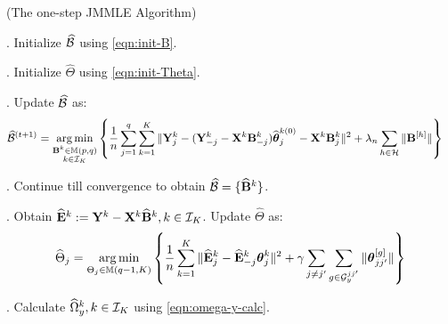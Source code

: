 \begin{Algorithm}
(The one-step JMMLE Algorithm)
\label{algo:jmmle-algo-1step}

. Initialize $\widehat {{\cal{B}}}$ using \eqref{eqn:init-B}.

. Initialize $\widehat \Theta$ using \eqref{eqn:init-Theta}.

. Update $\widehat {{\cal{B}}}$ as:
%
\begin{align*}
\widehat {{\cal{B}}}^{(t+1)} &= \operatorname*{arg\,min}_{\substack{{\mathbf{B}}^k \in {\mathbb{M}}(p,q)\\k \in {\cal{I}}_K}} \left\{ \frac{1}{n} \sum_{j=1}^q \sum_{k=1}^K \| {\mathbf{Y}}^k_j - ({\mathbf{Y}}_{-j}^k - {\mathbf{X}}^k {\mathbf{B}}_{-j}^k) \widehat {{\boldsymbol{\theta}}}_j^{k (0)} - {\mathbf{X}}^k {\mathbf{B}}_j^{k } \|^2
+ \lambda_n \sum_{h \in {\cal{H}}} \| {\mathbf{B}}^{[h]} \| \right\}
\end{align*}

. Continue till convergence to obtain $\widehat {{\cal{B}}} = \{ \widehat {{\mathbf{B}}}^k \}$.

. Obtain $\widehat {{\mathbf{E}}}^k := {\mathbf{Y}}^k - {\mathbf{X}}^k \widehat {{\mathbf{B}}}^k, k \in {\cal{I}}_K$. Update $\widehat \Theta$ as:
%
\begin{align*}
\widehat \Theta_j = \operatorname*{arg\,min}_{\Theta_j \in {\mathbb{M}}(q-1, K)}
\left\{ \frac{1}{n} \sum_{k=1}^K
\| \widehat {{\mathbf{E}}}_j^k - \widehat {{\mathbf{E}}}_{-j}^k {\boldsymbol{\theta}}_j^k \|^2
+ \gamma \sum_{j \neq j'} \sum_{g \in {\cal{G}}_y^{jj'}} \| {\boldsymbol{\theta}}_{jj'}^{[g]} \| \right\}
\end{align*}

. Calculate $\widehat \Omega_y^k, k \in {\cal{I}}_K$ using \eqref{eqn:omega-y-calc}.
\end{Algorithm}

